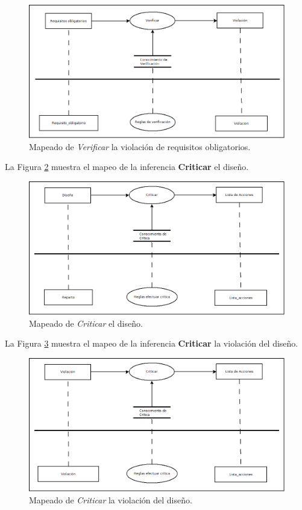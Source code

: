 \begin{figure}[H]
  \centering
  \includegraphics[scale=0.35]{imaxes/RequisitosObligatoriosVerificarViolacion.png}
  \caption{\label{fig:RequisitosObligatoriosVerificarViolacion}Mapeado de \textit{Verificar} la violación de requisitos obligatorios.}
\end{figure}

La Figura \ref{fig:DisenoCriticarListaAciones} muestra el mapeo de la inferencia \textbf{Criticar} el diseño.

\begin{figure}[H]
  \centering
  \includegraphics[scale=0.35]{imaxes/DisenoCriticarListaAciones.png}
  \caption{\label{fig:DisenoCriticarListaAciones}Mapeado de \textit{Criticar} el diseño.}
\end{figure}

La Figura \ref{fig:ViolacionCriticarListaAciones} muestra el mapeo de la inferencia \textbf{Criticar} la violación del diseño.

\begin{figure}[H]
  \centering
  \includegraphics[scale=0.35]{imaxes/ViolacionCriticarListaAciones.png}
  \caption{\label{fig:ViolacionCriticarListaAciones}Mapeado de \textit{Criticar} la violación del diseño.}
\end{figure}

